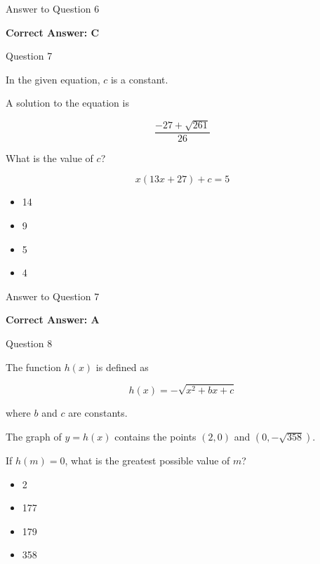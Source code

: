 \documentclass{beamer}
\begin{document}
\begin{frame}{Answer to Question 6}

\textbf{Correct Answer: C}

\end{frame}


\begin{frame}{Question 7}

In the given equation, $c$ is a constant.

A solution to the equation is

\[
\frac{-27+\sqrt{261}}{26}
\]

What is the value of $c$?

\[
x(13x+27)+c=5
\]

\begin{itemize}
    \item[A.] 14
    \item[B.] 9
    \item[C.] 5
    \item[D.] 4
\end{itemize}

\end{frame}

\begin{frame}{Answer to Question 7}

\textbf{Correct Answer: A}

\end{frame}


\begin{frame}{Question 8}

The function $h(x)$ is defined as

\[
h(x)=-\sqrt{x^2+bx+c}
\]

where $b$ and $c$ are constants.

The graph of $y=h(x)$ contains the points $(2,0)$ and $(0,-\sqrt{358})$.

If $h(m)=0$, what is the greatest possible value of $m$?

\begin{itemize}
    \item[A.] 2
    \item[B.] 177
    \item[C.] 179
    \item[D.] 358
\end{itemize}

\end{frame}
\end{document}
